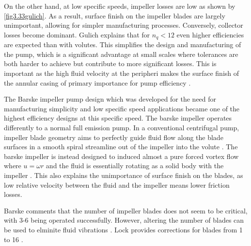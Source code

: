 On the other hand, at low specific speeds, impeller losses are low as shown by \cref{fig3.33gulich}.  As a result, surface finish on the impeller blades are largely unimportant, allowing for simpler manufacturing processes. Conversely, collector losses become dominant.  Gulich explains \cite{gulich7.12} that for $n_q<12$ even higher efficiencies are expected than with volutes. This simplifies the design and manufacturing of the pump, which is a significant advantage at small scales where tolerances are both harder to achieve but contribute to more significant losses.  This is important as the high fluid velocity at the peripheri makes the surface finish of the annular casing of primary importance for pump efficiency \cite{lockdesignfeatures}.

The Barske impeller pump design which was developed for the need for manufacturing simplicity and low specific speed applications became one of the highest efficiency designs at this specific speed.  The barske impeller operates differently to a normal full emission pump. In a conventional centrifugal pump, impeller blade geometry aims to perfectly guide fluid flow along the blade surfaces in a smooth spiral streamline out of the impeller into the volute \cite{something}. The barske impeller is instead designed to induced almost a pure forced vortex flow where $u=\omega r$ and the fluid is essentially rotating as a solid body with the impeller \cite{barskeunconventionalpaper}. This also explains the unimportance of surface finish on the blades, as low relative velocity between the fluid and the impeller means lower friction losses. 


Barske comments that the number of impeller blades does not seem to be critical, with 3-6 being operated successfully. However, altering the number of blades can be used to elminite fluid vibrations \cite{barske1953}. Lock provides corrections for blades from 1 to 16 \cite{lockfig10A}.

